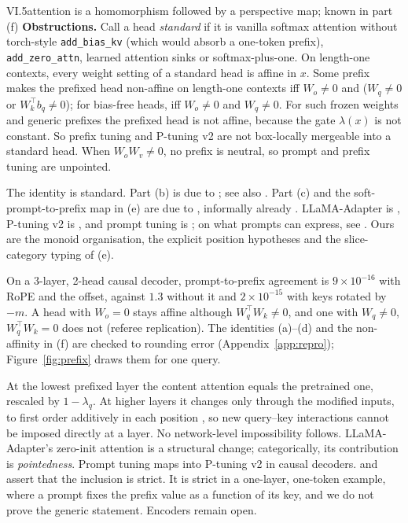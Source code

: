 \begin{theorem}{VI.5}{attention is a homomorphism followed by a perspective map; known in part}
(f) \textbf{Obstructions.} Call a head \emph{standard} if it is vanilla softmax attention without torch-style
\texttt{add\_bias\_kv} (which would absorb a one-token prefix), \texttt{add\_zero\_attn}, learned attention sinks or
softmax-plus-one. On length-one contexts, every weight setting of a standard head is affine in $x$. Some prefix makes the
prefixed head non-affine on length-one contexts iff $W_o\ne0$ and ($W_q\ne0$ or $W_k^\top b_q\ne0$); for bias-free heads,
iff $W_o\ne0$ and $W_q\ne0$. For such frozen weights and generic prefixes the prefixed head is not affine, because the
gate $\lambda(x)$ is not constant. So prefix tuning and P-tuning v2 are not box-locally mergeable into a standard head.
When $W_oW_v\ne0$, no prefix is neutral, so prompt and prefix tuning are unpointed.
\end{theorem}

The identity is standard. Part (b) is due to \citet{he2021unified}; see also \citet{chen2022inducer}. Part (c) and the
soft-prompt-to-prefix map in (e) are due to \citet[§2.2 and §6]{petrov2023prompting}, informally already
\citet[§7.2]{li2021prefix}. LLaMA-Adapter is \citet{zhang2023llama}, P-tuning v2 is \citet{liu2021p}, and prompt tuning
is \citet{lester2021power}; on what prompts can express, see \citet{wang2023universality}. Ours are the monoid
organisation, the explicit position hypotheses and the slice-category typing of (e).

\noindent{}\enspace On a 3-layer, 2-head causal decoder, prompt-to-prefix agreement is $9\times10^{-16}$ with
RoPE and the offset, against $1.3$ without it and $2\times10^{-15}$ with keys rotated by $-m$. A head with $W_o=0$ stays
affine although $W_q^\top W_k\ne0$, and one with $W_q\ne0$, $W_q^\top W_k=0$ does not (referee replication). The identities
(a)--(d) and the non-affinity in (f) are checked to rounding error (Appendix~\ref{app:repro}); Figure~\ref{fig:prefix}
draws them for one query.

\begin{explains}
At the lowest prefixed layer the content attention equals the pretrained one, rescaled by $1-\lambda_q$. At higher layers
it changes only through the modified inputs, to first order additively in each position
\citep[§6]{petrov2023prompting}, so new query--key interactions cannot be imposed directly at a layer. No network-level
impossibility follows. LLaMA-Adapter's zero-init attention is a structural change; categorically, its contribution is
\emph{pointedness}. Prompt tuning maps into P-tuning v2 in causal decoders. \citet{petrov2023prompting} and
\citet{li2021prefix} assert that the inclusion is strict. It is strict in a one-layer, one-token example, where a prompt
fixes the prefix value as a function of its key, and we do not prove the generic statement. Encoders remain open.
\end{explains}


